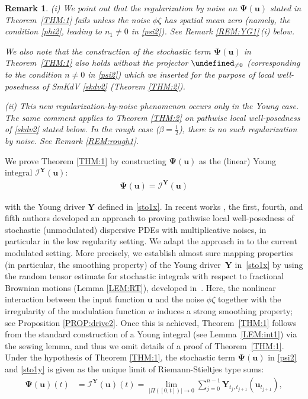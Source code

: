 \documentclass[letterpaper, 11pt,  reqno]{amsart}
\newtheorem{remark}[theorem]{Remark}
\newcommand{\1}{\hspace{0.5mm}\textup{I}\hspace{0.5mm}}
\newcommand{\I}{\mathcal{I}}
\newcommand{\noi}{\noindent}
\let\P= \undefined
\newcommand{\P}{\mathbf{P}}
\newcommand{\be}{\beta}
\newcommand{\uu}{\mathbf{u}}
\newcommand{\z}{\zeta}
\newcommand{\PPsi}{\pmb{\Psi}}
\newcommand{\YY}{\mathbf{Y}}
\numberwithin{equation}{section}
\numberwithin{theorem}{section}
\begin{document}
\begin{remark}\label{REM:n0}\rm 
(i)  We point out that 
 the regularization by noise 
 on $\PPsi(\uu)$ stated in Theorem~\ref{THM:1}
 fails
unless the noise $\phi \z$ has spatial mean zero (namely, 
the condition \eqref{phi2}, 
leading to $n_1 \ne 0$ in \eqref{psi2}).
See Remark \ref{REM:YG1}\,(i) below.




We also note that 
 the construction of the stochastic term $\PPsi(\uu)$ in Theorem~\ref{THM:1}
  also holds without the projector $\P_{\ne 0}$ 
(corresponding  to the condition $n \ne 0$ in \eqref{psi2})
which we inserted for the purpose of local well-posedness
of SmKdV \eqref{skdv2} (Theorem \ref{THM:2}).


\smallskip


\noi
(ii) This new regularization-by-noise phenomenon
occurs only in the Young case.
The same comment applies to Theorem \ref{THM:2} 
on pathwise local well-posedness of \eqref{skdv2} stated below.
In the rough case ($\be = \frac 12$), 
there is no such 
regularization by noise.
See Remark \ref{REM:rough1}.

\end{remark}



We prove 
 Theorem \ref{THM:1}
 by constructing
 $\PPsi(\uu)$
 as the (linear) Young integral
$\I^\YY(\uu)$:
\begin{align}
\PPsi (\uu) = \I^\YY(\uu)
\label{sto1y}
\end{align}



\noi
with 
the Young driver
$\YY$
defined in \eqref{sto1x}.
In recent works \cite{CLO2, CLO3, COZ, CLOO}, 
the first, fourth, and fifth authors
developed
an approach to proving pathwise local well-posedness
of stochastic (unmodulated) dispersive PDEs with multiplicative noises, 
in particular in the low regularity setting.
We adapt the approach in 
\cite{CLO2, CLO3, COZ, CLOO}
to the current modulated setting.
More precisely, 
we   establish almost sure mapping  properties
(in particular, the smoothing property)
of the Young driver~$\YY$ in~\eqref{sto1x}
by using
the random tensor estimate
for stochastic integrals
with respect to fractional Brownian motions 
(Lemma \ref{LEM:RT}), 
developed in~\cite{CLO2}.
Here,   the nonlinear interaction between the input function $\uu$
and the noise $\phi\z$ 
together with 
 the irregularity of the modulation function $w$
induces a strong smoothing property;
see Proposition \ref{PROP:drive2}.
Once this is achieved, 
Theorem~\ref{THM:1}
follows from the standard construction 
of a Young integral 
(see
Lemma~\ref{LEM:int1})
via the sewing lemma, 
and thus we omit details of a proof of 
Theorem~\ref{THM:1}.
Under the hypothesis of Theorem \ref{THM:1}, 
the stochastic term $\PPsi(\uu)$
in \eqref{psi2} and \eqref{sto1y}
is given 
as the unique limit of 
Riemann-Stieltjes type sums:
\begin{align}
\PPsi(\uu)(t)
& = \I^{\YY}(\uu)(t) = \lim_{|\Pi([0,t])|\to 0} 
\sum^{n-1}_{j=0} \YY_{t_j,t_{j+1}}(\uu_{t_{j+1}}), 
\label{sto1z}
\end{align} 
\end{document}
